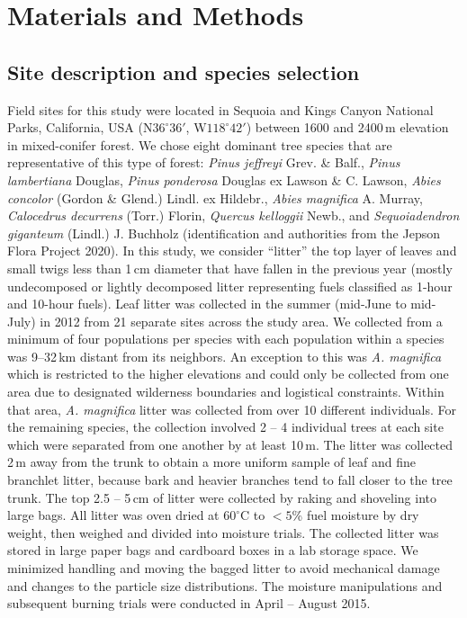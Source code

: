 \documentclass[letterpaper,12pt]{article}
\begin{document}
\section*{Materials and Methods}

\subsection*{Site description and species selection}

Field sites for this study were located in Sequoia and Kings Canyon National
Parks, California, USA (N$36^\circ 36'$, W$118^\circ 42'$) between 1600 and
2400\,m elevation in mixed-conifer forest. We chose eight dominant tree species
that are representative of this type of forest: \emph{Pinus jeffreyi} Grev. \&
Balf., \emph{Pinus lambertiana} Douglas, \emph{Pinus ponderosa} Douglas ex Lawson \& C. Lawson,
\emph{Abies concolor} (Gordon \& Glend.) Lindl. ex Hildebr., \emph{Abies
  magnifica} A. Murray, \emph{Calocedrus decurrens} (Torr.) Florin,
\emph{Quercus kelloggii} Newb., and \emph{Sequoiadendron giganteum} (Lindl.) J.
Buchholz (identification and authorities from the Jepson Flora Project 2020). In this study, we consider ``litter'' the top layer of leaves and small
twigs less than 1\,cm diameter that have fallen in the previous year (mostly
undecomposed or lightly decomposed litter representing fuels classified as
1-hour and 10-hour fuels). Leaf litter was collected in the summer (mid-June to
mid-July) in 2012 from 21 separate sites across the study area. We collected
from a minimum of four populations per species with each population within a
species was 9--32\,km distant from its neighbors. An exception to this was
\emph{A. magnifica} which is restricted to the higher elevations and could only
be collected from one area due to designated wilderness boundaries and
logistical constraints. Within that area, \emph{A. magnifica} litter was
collected from over 10 different individuals. For the remaining species, the
collection involved 2 -- 4 individual trees at each site which were separated
from one another by at least 10\,m. The litter was collected 2\,m away from the
trunk to obtain a more uniform sample of leaf and fine branchlet litter,
because bark and heavier branches tend to fall closer to the tree trunk. The
top 2.5 -- 5\,cm of litter were collected by raking and shoveling into large bags.
All litter was oven dried at $60^\circ$C to $< 5$\% fuel moisture by dry
weight, then weighed and divided into moisture trials. The collected litter was
stored in large paper bags and cardboard boxes in a lab storage space. We
minimized handling and moving the bagged litter to avoid mechanical damage and
changes to the particle size distributions. The moisture manipulations and
subsequent burning trials were conducted in April -- August 2015.
\end{document}

